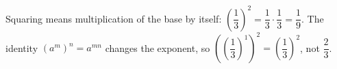 Squaring means multiplication of the base by itself: $(\dfrac{1}{3})^2=\dfrac{1}{3}\cdot\dfrac{1}{3}=\boxed{\dfrac{1}{9}}$. The identity $(a^m)^n=a^{mn}$ changes the exponent, so $((\dfrac{1}{3})^1)^2=(\dfrac{1}{3})^2$, not $\dfrac{2}{3}$.
